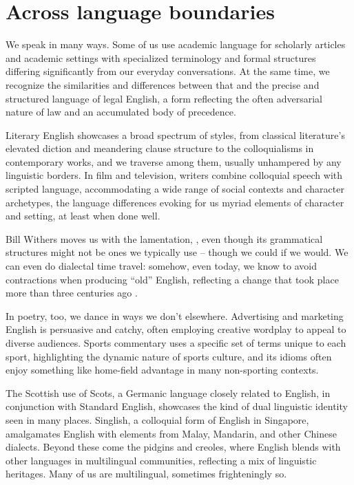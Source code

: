 \chapter{Across language boundaries}

We speak in many ways. Some of us use academic language for scholarly articles and academic settings with specialized terminology and formal structures differing significantly from our everyday conversations. At the same time, we recognize the similarities and differences between that and the precise and structured language of legal English, a form reflecting the often adversarial nature of law and an accumulated body of precedence.

Literary English showcases a broad spectrum of styles, from classical literature's elevated diction and meandering clause structure to the colloquialisms in contemporary works, and we traverse among them, usually unhampered by any linguistic borders. In film and television, writers combine colloquial speech with scripted language, accommodating a wide range of social contexts and character archetypes, the language differences evoking for us myriad elements of character and setting, at least when done well.

Bill Withers moves us with the lamentation, , even though its grammatical structures might not be ones we typically use -- though we could if we would. We can even do dialectal time travel: somehow, even today, we know to avoid contractions when producing \enquote{old} English, reflecting a change that took place more than three centuries ago \citep{CastilloGonzalez2007}.

In poetry, too, we dance in ways we don't elsewhere. Advertising and marketing English is persuasive and catchy, often employing creative wordplay to appeal to diverse audiences. Sports commentary uses a specific set of terms unique to each sport, highlighting the dynamic nature of sports culture, and its idioms often enjoy something like home-field advantage in many non-sporting contexts.

The Scottish use of Scots, a Germanic language closely related to English, in conjunction with Standard English, showcases the kind of dual linguistic identity seen in many places. Singlish, a colloquial form of English in Singapore, amalgamates English with elements from Malay, Mandarin, and other Chinese dialects. Beyond these come the pidgins and creoles, where English blends with other languages in multilingual communities, reflecting a mix of linguistic heritages. Many of us are multilingual, sometimes frighteningly so.

